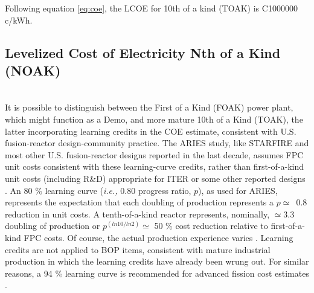 Following equation \ref{eq:coe}, the LCOE for 10th of a kind (TOAK) is C1000000 c/kWh. 

\subsection{Levelized Cost of Electricity Nth of a Kind (NOAK)} \\ 

It is possible to distinguish between the First of a Kind (FOAK) power plant, which might function as a Demo, and more mature 10th of a Kind (TOAK), the latter incorporating learning credits in the COE estimate, consistent with U.S. fusion-reactor design-community practice. The ARIES study, like STARFIRE \cite{BAK80} and most other U.S. fusion-reactor designs reported in the last decade, assumes FPC unit costs consistent with these learning-curve \cite{Hir64,Arg90} credits, rather than first-of-a-kind unit costs (including R\&D) appropriate for ITER \cite{Ite89} or some other reported designs \cite{Coo89b}. An 80 \% learning curve ({\it {\it i.e.},} 0.80 progress ratio, $p$), as used for ARIES, represents the expectation that each doubling of production represents a \hbox{$p\simeq$ 0.8} reduction in unit costs. A tenth-of-a-kind reactor represents, nominally, $\simeq$3.3 doubling of production or $p^{(ln 10/ln 2)}\simeq$ 50 \% cost reduction relative to first-of-a-kind FPC costs.  Of course, the actual production experience varies \cite{Arg90}.  Learning credits are not applied to BOP items, consistent with mature industrial production in which the learning credits have already been wrung out.  For similar reasons, a 94 \% learning curve is recommended for advanced fission cost estimates \cite{Del93}.   